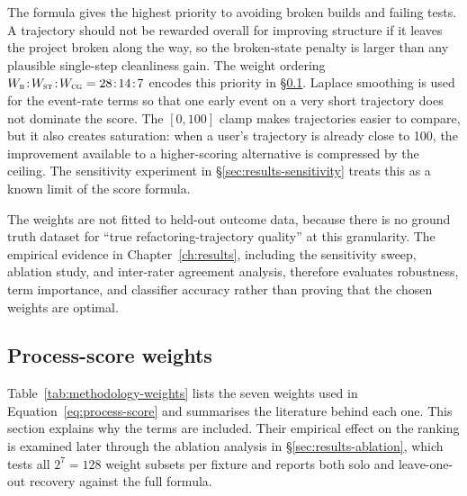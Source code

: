 The formula gives the highest priority to avoiding broken builds and failing tests. A trajectory should not be rewarded overall for improving structure if it leaves the project broken along the way, so the broken-state penalty is larger than any plausible single-step cleanliness gain. The weight ordering $W_{\textsc{b}}\!:\!W_{\textsc{st}}\!:\!W_{\textsc{cg}} = 28\!:\!14\!:\!7$ encodes this priority in \S\ref{sec:methodology-weights}. Laplace smoothing is used for the event-rate terms so that one early event on a very short trajectory does not dominate the score. The $[0, 100]$ clamp makes trajectories easier to compare, but it also creates saturation: when a user's trajectory is already close to 100, the improvement available to a higher-scoring alternative is compressed by the ceiling. The sensitivity experiment in \S\ref{sec:results-sensitivity} treats this as a known limit of the score formula.

The weights are not fitted to held-out outcome data, because there is no ground truth dataset for ``true refactoring-trajectory quality'' at this granularity. The empirical evidence in Chapter~\ref{ch:results}, including the sensitivity sweep, ablation study, and inter-rater agreement analysis, therefore evaluates robustness, term importance, and classifier accuracy rather than proving that the chosen weights are optimal.

\subsection{Process-score weights}
\label{sec:methodology-weights}

Table~\ref{tab:methodology-weights} lists the seven weights used in Equation~\eqref{eq:process-score} and summarises the literature behind each one. This section explains why the terms are included. Their empirical effect on the ranking is examined later through the ablation analysis in \S\ref{sec:results-ablation}, which tests all $2^7 = 128$ weight subsets per fixture and reports both solo and leave-one-out recovery against the full formula.

